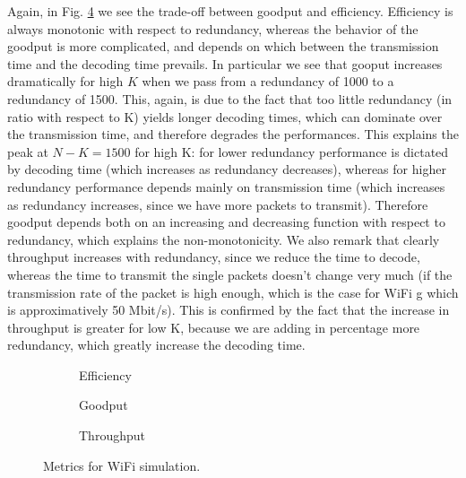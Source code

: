 Again, in Fig. \ref{fig:wifi} we see the trade-off between goodput and efficiency. Efficiency is always monotonic with respect to redundancy, whereas the behavior of the goodput is more complicated, and depends on which between the transmission time and the decoding time prevails. In particular we see that gooput increases dramatically for high $K$ when we pass from a redundancy of 1000 to a redundancy of 1500. This, again, is due to the fact that too little redundancy (in ratio with respect to K) yields longer decoding times, which can dominate over the transmission time, and therefore degrades the performances. This explains the peak at $N-K=1500$ for high K: for lower redundancy performance is dictated by decoding time (which increases as redundancy decreases), whereas for higher redundancy performance depends mainly on transmission time (which increases as redundancy increases, since we have more packets to transmit). Therefore goodput depends both on an increasing and decreasing function with respect to redundancy, which explains the non-monotonicity.  We also remark that clearly throughput increases with redundancy, since we reduce the time to decode, whereas the time to transmit the single packets doesn't change very much (if the transmission rate of the packet is high enough, which is the case for WiFi g which is approximatively 50 Mbit/s). This is confirmed by the fact that the increase in throughput is greater for low K, because we are adding in percentage more redundancy, which greatly increase the decoding time. 
\begin{figure}[!hp]
\centering
\begin{subfigure}{0.23\textwidth}
	\captionsetup{justification=centering,font=scriptsize}
	\centering
	\setlength\fwidth{\textwidth}
	\setlength{}
	
	\caption{Efficiency}
	\label{fig:wifi_eff}
\end{subfigure}\hspace{2em}%
\begin{subfigure}{0.23\textwidth}
	\captionsetup{justification=centering,font=scriptsize}
	\centering
	\setlength\fwidth{\textwidth}
	\setlength{}
	
	\caption{Goodput}
	\label{fig:wifi_good}
\end{subfigure}\hspace{2em}%
\begin{subfigure}{0.23\textwidth}
	\captionsetup{justification=centering,font=scriptsize}
	\centering
	\setlength\fwidth{\textwidth}
	\setlength{}
	
	\caption{Throughput}
	\label{fig:wifi_thr}
\end{subfigure}
\caption{Metrics for WiFi simulation. }
\label{fig:wifi}
\end{figure}
